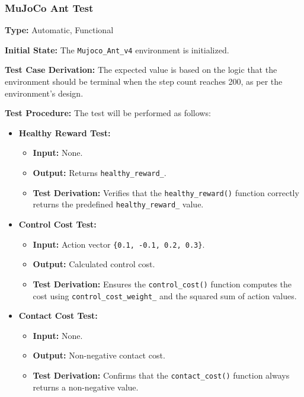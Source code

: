 \documentclass[12pt, titlepage]{article}
\begin{document}
\subsubsection{MuJoCo Ant Test}

\textbf{Type:} Automatic, Functional

\textbf{Initial State:} The \texttt{Mujoco\_Ant\_v4} environment is initialized.

\textbf{Test Case Derivation:} The expected value is based on the logic that the environment should be terminal when the step count reaches 200, as per the environment's design.

\textbf{Test Procedure:} The test will be performed as follows:
\begin{itemize}
    \item \textbf{Healthy Reward Test:}
    \begin{itemize}
        \item \textbf{Input:} None.
        \item \textbf{Output:} Returns \texttt{healthy\_reward\_}.
        \item \textbf{Test Derivation:} Verifies that the \texttt{healthy\_reward()} function correctly returns the predefined \texttt{healthy\_reward\_} value.
    \end{itemize}

    \item \textbf{Control Cost Test:}
    \begin{itemize}
        \item \textbf{Input:} Action vector \texttt{\{0.1, -0.1, 0.2, 0.3\}}.
        \item \textbf{Output:} Calculated control cost.
        \item \textbf{Test Derivation:} Ensures the \texttt{control\_cost()} function computes the cost using \texttt{control\_cost\_weight\_} and the squared sum of action values.
    \end{itemize}

    \item \textbf{Contact Cost Test:}
    \begin{itemize}
        \item \textbf{Input:} None.
        \item \textbf{Output:} Non-negative contact cost.
        \item \textbf{Test Derivation:} Confirms that the \texttt{contact\_cost()} function always returns a non-negative value.
    \end{itemize}


\end{itemize}
\end{document}
